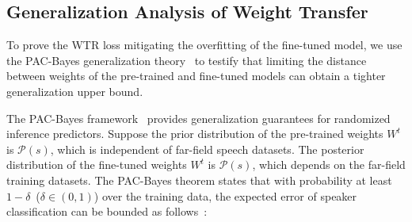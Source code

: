 \documentclass{article}
\begin{document}
\subsection{Generalization Analysis of Weight Transfer}
To prove the WTR loss mitigating the overfitting of the fine-tuned model, we use the PAC-Bayes generalization theory~\cite{mcallester1999pac} to testify that limiting the distance between weights of the pre-trained and fine-tuned models can obtain a tighter generalization upper bound. %

The PAC-Bayes framework~\cite{mcallester1999pac} provides generalization guarantees for randomized inference predictors. Suppose the prior distribution of the pre-trained weights $W^t$ is $\mathcal{P}(s)$, which is independent of far-field speech datasets. The posterior distribution of the fine-tuned weights $W^t$ is $\mathcal{P}(s)$, which depends on the far-field training datasets. The PAC-Bayes theorem states that with probability at least $1-\delta$~($\delta \in (0,1)$) over %
the training data, the expected error of speaker classification can be bounded as follows~\cite{mcallester1999pac}:

\iffalse
Let $H$ be some hypothesis class. Let $P$ be a prior
distribution on $H$ that is independent of the training set. Let $Q_S$ be a posterior distribution on $H$
that may depend on the training set $S$. Suppose the loss function is bounded from above by $C$. With
probability $1-\delta$ over the randomness of the training set, the following holds
\fi
\iffalse
\begin{equation}
\begin{aligned}
\underset{ f \sim \mathcal{P}(t))}{\mathbb{E}}[\hat{\mathcal{L}(f)}] \leq \underset{f \sim \mathcal{P}(t)}{\mathbb{E}}\left[f_C\left(f_E(x_i^t), y_i^_t\right)\right]+ \\ C \sqrt{\frac{\operatorname{KL}\left(\mathcal{P}(s) \| \mathcal{P}(t)\right)+3 \ln \frac{n}{\delta}+8}{n}},
\end{aligned}
\label{seq2}
\end{equation}
\fi 
\end{document}
